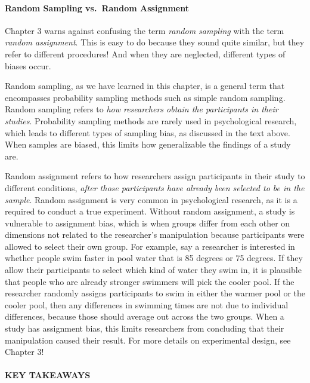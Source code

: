 \documentclass[
]{krantz}
\begin{document}
\paragraph*{Random Sampling vs.~Random Assignment}\label{random-sampling-vs.-random-assignment}

Chapter 3 warns against confusing the term \emph{random sampling} with the term \emph{random assignment}. This is easy to do because they sound quite similar, but they refer to different procedures! And when they are neglected, different types of biases occur.

Random sampling, as we have learned in this chapter, is a general term that encompasses probability sampling methods such as simple random sampling. Random sampling refers to \emph{how researchers obtain the participants in their studies}. Probability sampling methods are rarely used in psychological research, which leads to different types of sampling bias, as discussed in the text above. When samples are biased, this limits how generalizable the findings of a study are.

Random assignment refers to how researchers assign participants in their study to different conditions, \emph{after those participants have already been selected to be in the sample}. Random assignment is very common in psychological research, as it is a required to conduct a true experiment. Without random assignment, a study is vulnerable to assignment bias, which is when groups differ from each other on dimensions not related to the researcher's manipulation because participants were allowed to select their own group. For example, say a researcher is interested in whether people swim faster in pool water that is 85 degrees or 75 degrees. If they allow their participants to select which kind of water they swim in, it is plausible that people who are already stronger swimmers will pick the cooler pool. If the researcher randomly assigns participants to swim in either the warmer pool or the cooler pool, then any differences in swimming times are not due to individual differences, because those should average out across the two groups. When a study has assignment bias, this limits researchers from concluding that their manipulation caused their result. For more details on experimental design, see Chapter 3!

\paragraph*{KEY TAKEAWAYS}\label{key-takeaways-13}
\end{document}
